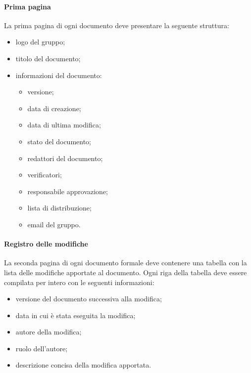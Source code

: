                 \paragraph{Prima pagina}
                La prima pagina di ogni documento deve presentare la seguente struttura:
                \begin{itemize}
                    \item logo del gruppo;
                    \item titolo del documento;
                    \item informazioni del documento:
                    \begin{itemize}
                        \item versione;
                        \item data di creazione;
                        \item data di ultima modifica;
                        \item stato del documento;
                        \item redattori del documento;
                        \item verificatori;
                        \item responsabile approvazione;
                        \item lista di distribuzione;
                        \item email del gruppo.
                    \end{itemize}
                \end{itemize}
                \paragraph{Registro delle modifiche}
                La seconda pagina di ogni documento formale deve contenere una tabella con la lista delle modifiche apportate al documento. Ogni riga della tabella deve essere compilata per intero con le seguenti informazioni:
                \begin{itemize}
                    \item versione del documento successiva alla modifica;
                    \item data in cui è stata eseguita la modifica;
                    \item autore della modifica;
                    \item ruolo dell'autore;
                    \item descrizione concisa della modifica apportata.
                \end{itemize}
